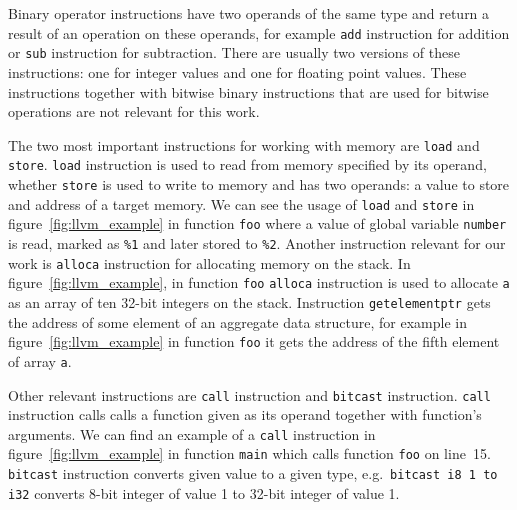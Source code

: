 Binary operator instructions have two operands of the same type and return a
result of an operation on these operands, for example \texttt{add} instruction
for addition or \texttt{sub} instruction for subtraction. There are usually two
versions of these instructions: one for integer values and one for floating
point values. These instructions together with bitwise binary instructions
that are used for bitwise operations are not relevant for this work.

The two most important instructions for working with memory are \texttt{load}
and \texttt{store}. \texttt{load} instruction is used to read from memory
specified by its operand, whether \texttt{store} is used to write to memory and
has two operands: a value to store and address of a target memory. We can see
the usage of \texttt{load} and \texttt{store} in figure~\ref{fig:llvm_example}
in function \texttt{foo} where a value of global variable \texttt{number} is
read, marked as \texttt{\%1} and later stored to \texttt{\%2}. Another
instruction relevant for our work is \texttt{alloca} instruction for allocating
memory on the stack. In figure~\ref{fig:llvm_example}, in function \texttt{foo}
\texttt{alloca} instruction is used to allocate \texttt{a} as an array of ten
32-bit integers on the stack. Instruction \texttt{getelementptr} gets the
address of some element of an aggregate data structure, for example in
figure~\ref{fig:llvm_example} in function \texttt{foo} it gets the address of
the fifth element of array \texttt{a}.

Other relevant instructions are \texttt{call} instruction and \texttt{bitcast}
instruction. \texttt{call} instruction calls calls a function given as its
operand together with function's arguments. We can find an example of a
\texttt{call} instruction in figure~\ref{fig:llvm_example} in function
\texttt{main} which calls function \texttt{foo} on line~15. \texttt{bitcast}
instruction converts given value to a given type, e.g.~\texttt{bitcast i8 1 to
i32} converts 8-bit integer of value 1 to 32-bit integer of value 1.
